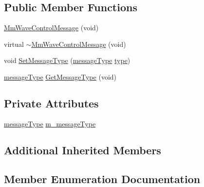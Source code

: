\subsection*{Public Member Functions}
\begin{DoxyCompactItemize}
\item 
\hyperlink{classns3_1_1MmWaveControlMessage_afc565a8b97fabc98125130150c19db22}{Mm\+Wave\+Control\+Message} (void)
\item 
virtual \hyperlink{classns3_1_1MmWaveControlMessage_a7587823bb128b7889df45a1f0e2cbb77}{$\sim$\+Mm\+Wave\+Control\+Message} (void)
\item 
void \hyperlink{classns3_1_1MmWaveControlMessage_a225f14e0b2e5314cd7706db55b47053d}{Set\+Message\+Type} (\hyperlink{classns3_1_1MmWaveControlMessage_afd7af53dea4ef8b652cf206acd508869}{message\+Type} \hyperlink{visualizer-ideas_8txt_add98db9e15e2a58cf2b57623e7aa893a}{type})
\item 
\hyperlink{classns3_1_1MmWaveControlMessage_afd7af53dea4ef8b652cf206acd508869}{message\+Type} \hyperlink{classns3_1_1MmWaveControlMessage_a2f2e3d9250bf001ec72aebaee055243e}{Get\+Message\+Type} (void)
\end{DoxyCompactItemize}
\subsection*{Private Attributes}
\begin{DoxyCompactItemize}
\item 
\hyperlink{classns3_1_1MmWaveControlMessage_afd7af53dea4ef8b652cf206acd508869}{message\+Type} \hyperlink{classns3_1_1MmWaveControlMessage_aa659b82e3c1515cbf69fc3358a1650c9}{m\+\_\+message\+Type}
\end{DoxyCompactItemize}
\subsection*{Additional Inherited Members}


\subsection{Member Enumeration Documentation}
